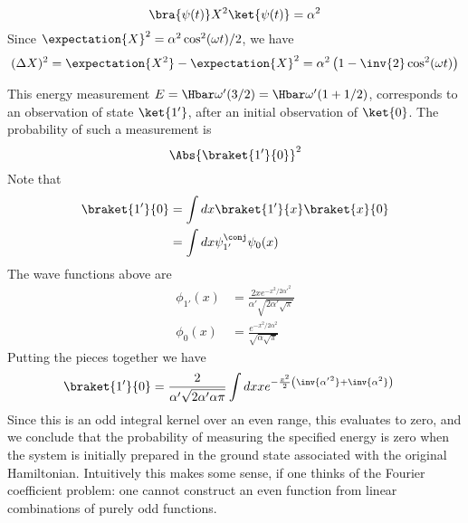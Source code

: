 {%
\begin{equation}\label{eqn:qmIexamPractice2008Dec:3:330}
\bra{\psi(t)} X^2 \ket{\psi(t)} = \alpha^2
\end{equation}
%
Since \(\expectation{X}^2 = \alpha^2 \cos^2(\omega t)/2\), we have
%
\begin{equation}\label{eqn:qmIexamPractice2008Dec:3:340}
(\Delta X)^2 = \expectation{X^2} - \expectation{X}^2 = \alpha^2 \left(1 - \inv{2} \cos^2(\omega t) \right)
\end{equation}
%

This energy measurement \(E = \Hbar \omega' (3/2) = \Hbar \omega' (1 + 1/2)\), corresponds to an observation of state \(\ket{1'}\), after an initial observation of \(\ket{0}\).  The probability of such a measurement is
%
\begin{equation}\label{eqn:qmIexamPractice2008Dec:3:400}
\Abs{ \braket{1'}{0} }^2
\end{equation}
%
Note that
%
\begin{equation}\label{eqn:qmIexamPractice:790}
\begin{aligned}
\braket{1'}{0}
&=
\int dx \braket{1'}{x}\braket{x}{0} \\
&=
\int dx \psi_{1'}^\conj \psi_0(x) \\
\end{aligned}
\end{equation}
%
The wave functions above are
\begin{equation}\label{eqn:qmIexamPractice2008Dec:3:410}
\begin{aligned}
\phi_{1'}(x) &= \frac{ 2 x e^{-x^2/2 {\alpha'}^2 }}{ \alpha' \sqrt{ 2 \alpha' \sqrt{\pi} } } \\
\phi_{0}(x) &= \frac{ e^{-x^2/2 {\alpha}^2 } } { \sqrt{ \alpha \sqrt{\pi} } }
\end{aligned}
\end{equation}
%
Putting the pieces together we have
%
\begin{equation}\label{eqn:qmIexamPractice2008Dec:3:810}
\begin{aligned}
\braket{1'}{0}
&=
\frac{2 }{ \alpha' \sqrt{ 2 \alpha' \alpha \pi } }
\int dx
x e^{-\frac{x^2}{2}\left( \inv{{\alpha'}^2} + \inv{\alpha^2} \right) }
\end{aligned}
\end{equation}
%
Since this is an odd integral kernel over an even range, this evaluates to zero, and we conclude that the probability of measuring the specified energy is zero when the system is initially prepared in the ground state associated with the original Hamiltonian.  Intuitively this makes some sense, if one thinks of the Fourier coefficient problem: one cannot construct an even function from linear combinations of purely odd functions.
} %
